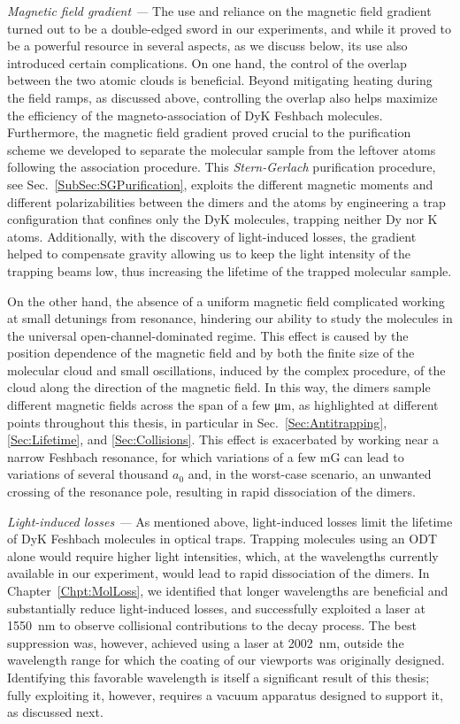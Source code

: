 \textit{Magnetic field gradient ---} 
The use and reliance on the magnetic field gradient turned out to be a double-edged sword in our experiments, and while it proved to be a powerful resource in several aspects, as we discuss below, its use also introduced certain complications. On one hand, the control of the overlap between the two atomic clouds is beneficial. Beyond mitigating heating during the field ramps, as discussed above, controlling the overlap also helps maximize the efficiency of the magneto-association of DyK Feshbach molecules. Furthermore, the magnetic field gradient proved crucial to the purification scheme we developed to separate the molecular sample from the leftover atoms following the association procedure. This \textit{Stern-Gerlach} purification procedure, see Sec.~\ref{SubSec:SGPurification}, exploits the different magnetic moments and different polarizabilities between the dimers and the atoms by engineering a trap configuration that confines only the DyK molecules, trapping neither Dy nor K atoms. Additionally, with the discovery of light-induced losses, the gradient helped to compensate gravity allowing us to keep the light intensity of the trapping beams low, thus increasing the lifetime of the trapped molecular sample. 

On the other hand, the absence of a uniform magnetic field complicated working at small detunings from resonance, hindering our ability to study the molecules in the universal open-channel-dominated regime. This effect is caused by the position dependence of the magnetic field and by both the finite size of the molecular cloud and small oscillations, induced by the complex procedure, of the cloud along the direction of the magnetic field. In this way, the dimers sample different magnetic fields across the span of a few \unit{\micro m}, as highlighted at different points throughout this thesis, in particular in Sec.~\ref{Sec:Antitrapping}, \ref{Sec:Lifetime}, and \ref{Sec:Collisions}. This effect is exacerbated by working near a narrow Feshbach resonance, for which variations of a few \unit{mG} can lead to variations of several thousand $a_0$ and, in the worst-case scenario, an unwanted crossing of the resonance pole, resulting in rapid dissociation of the dimers.

\textit{Light-induced losses ---} 
As mentioned above, light-induced losses limit the lifetime of DyK Feshbach molecules in optical traps. Trapping molecules using an \ac{ODT} alone would require higher light intensities, which, at the wavelengths currently available in our experiment, would lead to rapid dissociation of the dimers. In Chapter~\ref{Chpt:MolLoss}, we identified that longer wavelengths are beneficial and substantially reduce light-induced losses, and successfully exploited a laser at \SI{1550}{nm} to observe collisional contributions to the decay process. The best suppression was, however, achieved using a laser at \SI{2002}{nm}, outside the wavelength range for which  the coating of our viewports was originally designed. Identifying this favorable wavelength is itself a significant result of this thesis; fully exploiting it, however, requires a vacuum apparatus designed to support it, as discussed next.


